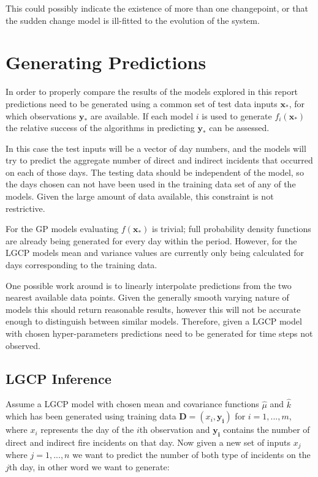 \documentclass[a4paper,11pt]{report}
\begin{document}
This could possibly indicate the existence of more than one changepoint, or that the sudden change model is ill-fitted to the evolution of the system. 


\chapter{Generating Predictions}

In order to properly compare the results of the models explored in this report predictions need to be generated using a common set of test data inputs \(\mathbf{x_*}\), for which observations \(\mathbf{y}_*\) are available. If each model \(i\) is used to generate \(f_i(\mathbf{x_*})\) the relative success of the algorithms in predicting \(\mathbf{y}_*\) can be assessed. \par

In this case the test inputs will be a vector of day numbers, and the models will try to predict the aggregate number of direct and indirect incidents that occurred on each of those days. The testing data should be independent of the model, so the days chosen can not have been used in the training data set of any of the models. Given the large amount of data available, this constraint is not restrictive. \par

For the GP models evaluating \(f(\mathbf{x_*})\) is trivial; full probability density functions are already being generated for every day within the period. However, for the LGCP models mean and variance values are currently only being calculated for days corresponding to the training data. \par

One possible work around is to linearly interpolate predictions from the two nearest available data points. Given the generally smooth varying nature of models this should return reasonable results, however this will not be accurate enough to distinguish between similar models. Therefore, given a LGCP model with chosen hyper-parameters predictions need to be generated for time steps not observed.

\section{LGCP Inference}

Assume a LGCP model with chosen mean and covariance functions \(\hat{\mu}\) and \(\hat{k}\) which has been generated using training data \(\mathbf{D} = (x_i,\mathbf{y_i})\) for  \(i = 1,...,m\), where \(x_i\) represents the day of the \(i\)th observation and \(\mathbf{y_i}\) contains the number of direct and indirect fire incidents on that day. Now given a new set of inputs \(x_j\) where \(j = 1,...,n\) we want to predict the number of both type of incidents on the \(j\)th day, in other word we want to generate:
\end{document}
